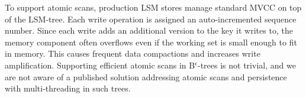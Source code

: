 To support atomic scans, production LSM stores manage standard MVCC on top of the LSM-tree.  Each write operation is assigned an auto-incremented sequence number. Since each write adds an additional version to the key it writes to, the memory component often overflows  even if the working set is small enough to fit in memory. This causes frequent data compactions and increases write amplification.
Supporting efficient atomic scans in B$^\epsilon$-trees is not trivial, and we are not aware of a published solution addressing atomic scans and persistence with multi-threading in such trees.


